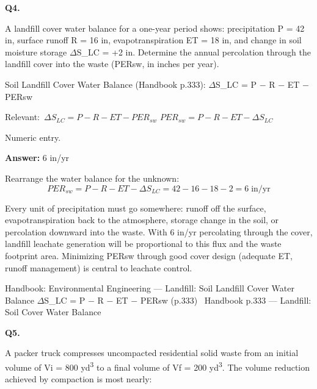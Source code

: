 \documentclass[11pt]{article}
\begin{document}
\vspace{9pt}
\filbreak
\textbf{\color{accent}Q4.}\par\vspace{2pt}
A landfill cover water balance for a one-year period shows: precipitation P = 42 in, surface runoff R = 16 in, evapotranspiration ET = 18 in, and change in soil moisture storage $\Delta$S\_LC = +2 in. Determine the annual percolation through the landfill cover into the waste (PERsw, in inches per year).

Soil Landfill Cover Water Balance (Handbook p.333):
$\Delta$S\_LC = P $-$ R $-$ ET $-$ PERsw\par\vspace{3pt}
{\small\color{soft}Relevant:}\ $\Delta S_{LC} = P - R - ET - PER_{sw}$ \quad $PER_{sw} = P - R - ET - \Delta S_{LC}$\par\vspace{3pt}
{\small\color{soft}Numeric entry.}\par\vspace{3pt}
\vspace{2pt}\par\noindent\colorbox{boxbg}{\parbox{\dimexpr\linewidth-2\fboxsep\relax}{%
\vspace{2pt}\textbf{Answer:} 6 in/yr\par\vspace{2pt}
{\small Rearrange the water balance for the unknown:
\[PER_{sw} = P - R - ET - \Delta S_{LC} = 42 - 16 - 18 - 2 = 6\;\text{in/yr}\]

Every unit of precipitation must go somewhere: runoff off the surface, evapotranspiration back to the atmosphere, storage change in the soil, or percolation downward into the waste. With 6 in/yr percolating through the cover, landfill leachate generation will be proportional to this flux and the waste footprint area. Minimizing PERsw through good cover design (adequate ET, runoff management) is central to leachate control.}\par\vspace{2pt}
{\footnotesize\color{soft}Handbook: Environmental Engineering --- Landfill: Soil Landfill Cover Water Balance $\Delta$S\_LC = P $-$ R $-$ ET $-$ PERsw (p.333) \textbullet\ Handbook p.333 --- Landfill: Soil Cover Water Balance}\vspace{2pt}
}}
\vspace{9pt}
\filbreak
\textbf{\color{accent}Q5.}\par\vspace{2pt}
A packer truck compresses uncompacted residential solid waste from an initial volume of Vi = 800 yd\textsuperscript{3} to a final volume of Vf = 200 yd\textsuperscript{3}. The volume reduction achieved by compaction is most nearly:
\end{document}
